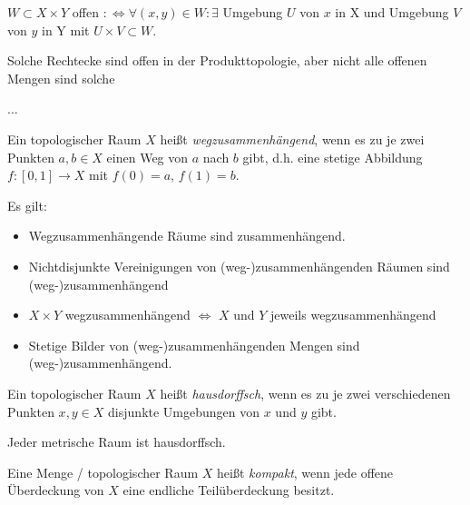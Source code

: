 \begin{defi}[Produkttopologie]
  $W \subset X\times Y$ offen
  $:\Leftrightarrow \forall (x,y) \in W: \exists$
  Umgebung $U$ von $x$ in X und Umgebung $V$ von $y$ in Y
  mit $U \times V \subset W$.
\end{defi}

\begin{bem}
  Solche \glqq Rechtecke\grqq{} sind offen in der Produkttopologie,
  aber nicht alle offenen Mengen sind solche
\end{bem}


﻿$\dots$

\begin{defi}[Wegzusammenhang]
Ein topologischer Raum $X$ heißt \emph{wegzusammenhängend}, wenn es zu je zwei Punkten $a, b \in X$ einen Weg von $a$ nach $b$ gibt, d.h. eine stetige Abbildung $f: [0, 1] \to X$ mit $f(0) = a$, $f(1) = b$.
\end{defi}

\begin{bem} Es gilt:
\begin{itemize}
\item Wegzusammenhängende Räume sind zusammenhängend.
\item Nichtdisjunkte Vereinigungen von (weg-)zusammenhängenden Räumen sind (weg-)zusammenhängend
\item $X \times Y$ wegzusammenhängend $\Leftrightarrow$ $X$ und $Y$ jeweils wegzusammenhängend
\item Stetige Bilder von (weg-)zusammenhängenden Mengen sind (weg-)zusammenhängend. \\
\end{itemize}
\end{bem}


\begin{defi}[Hausdorffsch]
Ein topologischer Raum $X$ heißt \emph{hausdorffsch}, wenn es zu je zwei verschiedenen Punkten $x, y \in X$ disjunkte Umgebungen von $x$ und $y$ gibt.
\end{defi}

\begin{bem} Jeder metrische Raum ist hausdorffsch. \\
\end{bem}

\begin{defi}[Kompaktheit]
Eine Menge / topologischer Raum $X$ heißt \emph{kompakt}, wenn jede offene Überdeckung von $X$ eine endliche Teilüberdeckung besitzt.
\end{defi}

